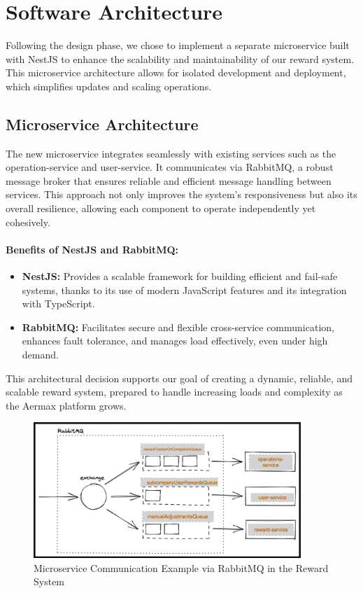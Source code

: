 \section{Software Architecture}
Following the design phase, we chose to implement a separate microservice built with NestJS to enhance the scalability and maintainability of our reward system. This microservice architecture allows for isolated development and deployment, which simplifies updates and scaling operations.

\subsection{Microservice Architecture}
The new microservice integrates seamlessly with existing services such as the operation-service and user-service. It communicates via RabbitMQ, a robust message broker that ensures reliable and efficient message handling between services. This approach not only improves the system's responsiveness but also its overall resilience, allowing each component to operate independently yet cohesively.

\paragraph{Benefits of NestJS and RabbitMQ:}
\begin{itemize}
    \item \textbf{NestJS:} Provides a scalable framework for building efficient and fail-safe systems, thanks to its use of modern JavaScript features and its integration with TypeScript.
    \item \textbf{RabbitMQ:} Facilitates secure and flexible cross-service communication, enhances fault tolerance, and manages load effectively, even under high demand.
\end{itemize}

This architectural decision supports our goal of creating a dynamic, reliable, and scalable reward system, prepared to handle increasing loads and complexity as the Aermax platform grows.

\begin{figure}[H]
    \centering
    \includegraphics[width=0.9\textwidth]{src/assets/chapters/rmq.png}
    \caption{Microservice Communication Example via RabbitMQ in the Reward System}
    \label{fig:microservice_communication_rabbitmq}
\end{figure}

